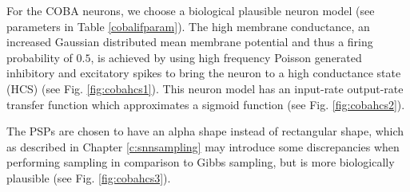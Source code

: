 For the COBA neurons, we choose a biological plausible neuron model (see parameters in Table \ref{cobalifparam}). 
The high membrane conductance, an increased Gaussian distributed mean membrane potential and thus a firing probability of $0.5$, is achieved by using high frequency Poisson generated inhibitory and excitatory spikes to bring the neuron to a high conductance state (HCS) (see Fig. \ref{fig:cobahcs1}). 
This neuron model has an input-rate output-rate transfer function which approximates a sigmoid function (see Fig. \ref{fig:cobahcs2}).

The PSPs are chosen to have an alpha shape instead of rectangular shape, which as described in Chapter \ref{c:snnsampling} may introduce some discrepancies when performing sampling in comparison to Gibbs sampling, but is more biologically plausible (see Fig. \ref{fig:cobahcs3}).

